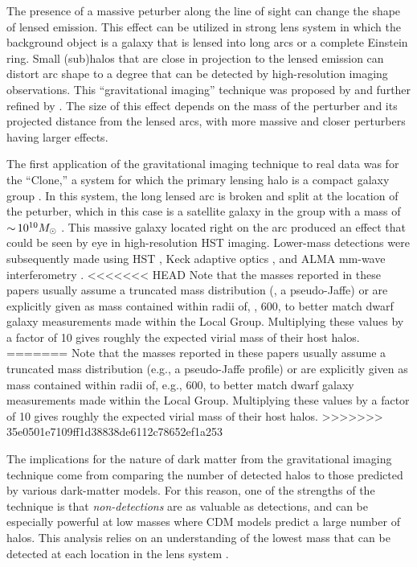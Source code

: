 \vspace{1em} 

The presence of a massive peturber along the line of sight can change the shape of lensed emission. 
This effect can be utilized in strong lens system in which the background object is a galaxy that is lensed into long arcs or a complete Einstein ring.
Small (sub)halos that are close in projection to the lensed emission can distort arc shape to a degree that can be detected by high-resolution imaging observations.
This ``gravitational imaging'' technique was proposed by \cite{Koopmans:aa} and further refined by \citet{Vegetti:2008aa,Vegetti:2009aa}.  The size of this effect depends on the mass of the perturber and its projected distance from the lensed arcs, with more massive and closer perturbers having larger effects.
 
The first application of the gravitational imaging technique to real data was for the ``Clone,'' a system for which the primary lensing halo is a compact galaxy group \citep[,][]{2009ApJ...699.1242L, Vegetti_2010_1}.
 In this system, the long lensed arc is broken and split at the location of the peturber, which in this case is a satellite galaxy in the group with a mass of $ {\sim}\, 10^{10} M_\odot$ \citep[][]{Vegetti_2010_1}.  This massive galaxy located right on the arc produced an effect that could be seen by eye in high-resolution HST imaging.  Lower-mass detections were subsequently made using HST \citep[$\roughly 10^9 \Msun$;][]{Vegetti_2010_2}, Keck adaptive optics \citep[$\roughly 10^8 \Msun$;][]{Vegetti_2012}, and ALMA mm-wave interferometry \citep[$\roughly 10^8 \Msun$;][]{Hezaveh_2016ltk}.  
<<<<<<< HEAD
 Note that the masses reported in these papers usually assume a truncated mass distribution (\eg, a pseudo-Jaffe) or are explicitly given as mass contained within radii of, \eg, 600\pc, to better match dwarf galaxy measurements made within the Local Group.  Multiplying these values by a factor of 10 gives roughly the expected virial mass of their host halos.
=======
 Note that the masses reported in these papers usually assume a truncated mass distribution (e.g., a pseudo-Jaffe profile) or are explicitly given as mass contained within radii of, e.g., 600\pc, to better match dwarf galaxy measurements made within the Local Group.  Multiplying these values by a factor of 10 gives roughly the expected virial mass of their host halos.
>>>>>>> 35e0501e7109ff1d38838de6112c78652ef1a253
 
The implications for the nature of dark matter from the gravitational imaging technique come from comparing the number of detected halos to those predicted by various dark-matter models.  
For this reason, one of the strengths of the technique is that {\em non-detections} are as valuable as detections, and can be especially powerful at low masses where CDM models predict a large number of halos.
This analysis relies on an understanding of the lowest mass that can be detected at each location in the lens system \citep[\eg,][]{Vegetti2014, Hezaveh_2016ltk, Ritondale++18}.
 

